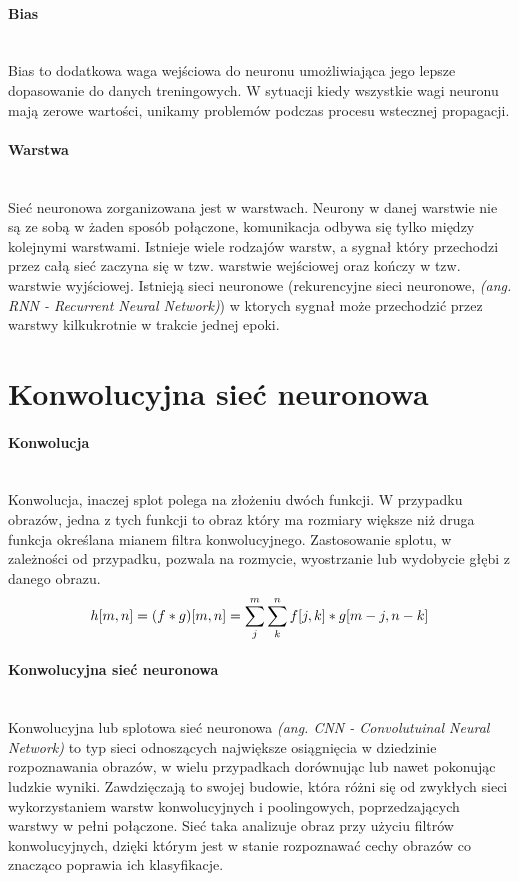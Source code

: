 \paragraph{Bias} \mbox{}\\
Bias to dodatkowa waga wejściowa do neuronu umożliwiająca jego lepsze dopasowanie
do danych treningowych. W sytuacji kiedy wszystkie wagi neuronu mają zerowe
wartości, unikamy problemów podczas procesu wstecznej propagacji.

\paragraph{Warstwa} \mbox{}\\
Sieć neuronowa zorganizowana jest w warstwach. Neurony w danej warstwie nie są
ze sobą w żaden sposób połączone, komunikacja odbywa się tylko między kolejnymi
warstwami. Istnieje wiele rodzajów warstw, a sygnał który przechodzi przez całą
sieć zaczyna się w tzw. warstwie wejściowej oraz kończy w tzw. warstwie wyjściowej.
Istnieją sieci neuronowe (rekurencyjne sieci neuronowe, \textit{(ang. RNN - Recurrent Neural Network)})
w ktorych sygnał może przechodzić przez warstwy kilkukrotnie w trakcie jednej epoki.

\section{Konwolucyjna sieć neuronowa}

\paragraph{Konwolucja} \mbox{}\\
Konwolucja, inaczej splot polega na złożeniu dwóch funkcji. W przypadku obrazów,
jedna z tych funkcji to obraz który ma rozmiary większe niż druga funkcja określana
mianem filtra konwolucyjnego. Zastosowanie splotu, w zależności od przypadku,
pozwala na rozmycie, wyostrzanie lub wydobycie głębi z danego obrazu.
\begin{equation}
h[m, n] = (f * g)[m, n] = \sum_j^m \sum_k^n f[j, k] * g[m-j, n-k] \\
\end{equation}

\paragraph{Konwolucyjna sieć neuronowa} \mbox{}\\
Konwolucyjna lub splotowa sieć neuronowa \textit{(ang. CNN - Convolutuinal Neural Network)}
to typ sieci odnoszących największe osiągnięcia w dziedzinie rozpoznawania obrazów,
w wielu przypadkach dorównując lub nawet pokonując ludzkie wyniki. Zawdzięczają to
swojej budowie, która różni się od zwykłych sieci wykorzystaniem warstw konwolucyjnych
i poolingowych, poprzedzających warstwy w pełni połączone. Sieć taka analizuje obraz
przy użyciu filtrów konwolucyjnych, dzięki którym jest w stanie rozpoznawać cechy
obrazów co znacząco poprawia ich klasyfikacje.

